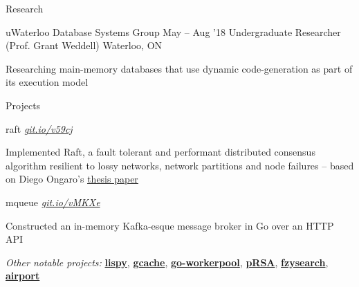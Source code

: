 \documentclass{resume} %
\begin{document}
\begin{rSection}{Research}
  \begin{rSubsection}{uWaterloo Database Systems Group}
	  {May -- Aug '18}
    {Undergraduate Researcher (Prof. Grant Weddell)}
	  {Waterloo, ON}
    \item Researching main-memory databases that use dynamic
      code-generation as part of its execution model
  \end{rSubsection}
\end{rSection}

\begin{rSection}{Projects}
  
  \begin{rSubsection}{raft}
	  {\em {\href{http://github.com/ridwanmsharif/raft}
		    {git.io/v59cj}}}
	  {}

    \item Implemented Raft, a fault tolerant and performant distributed
      consensus algorithm resilient to lossy networks, network partitions and
      node failures -- based on Diego Ongaro's
      \href{https://raft.github.io/raft.pdf}{\underline{thesis paper}}
      
  \end{rSubsection}

  \begin{rSubsection}{mqueue}
	  {\em {\href{http://github.com/ridwanmsharif/mqueue}
		    {git.io/vMKXe}}}
	  {}

    \item Constructed an in-memory Kafka-esque message broker in Go over an HTTP API
  \end{rSubsection}

  \begin{rMinisection}
    \item {\em Other notable projects:}
      \href{https://github.com/ridwanmsharif/lispy}{\textbf{lispy}},
      \href{https://github.com/ridwanmsharif/cache}{\textbf{gcache}},
      \href{https://github.com/ridwanmsharif/goworkerpool}{\textbf{go-workerpool}},
      \href{https://github.com/ridwanmsharif/prsa}{\textbf{pRSA}},
      \href{https://github.com/ridwanmsharif/fzysearch}{\textbf{fzysearch}},
      \href{https://github.com/ridwanmsharif/airport}{\textbf{airport}}
  \end{rMinisection}
\end{rSection}
\end{document}
